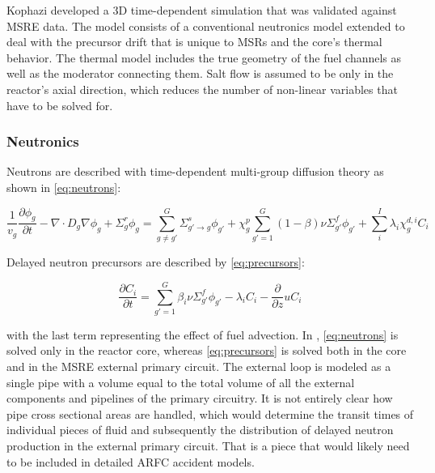 \documentclass{article}
\let\Oldsubsubsection\subsubsection
\renewcommand{\subsubsection}{\FloatBarrier\Oldsubsubsection}
\begin{document}
Kophazi developed a 3D time-dependent simulation that was validated against \gls{MSRE}
data. \cite{kophazi_development_????} The model consists of a conventional
neutronics model extended to deal with the precursor drift that is unique to
MSRs and the core's thermal behavior. The thermal model includes the true
geometry of the fuel channels as well as the moderator connecting them. Salt
flow is assumed to be only in the reactor's axial direction, which reduces the
number of non-linear variables that have to be solved for.

\subsubsection{Neutronics}

Neutrons are described with time-dependent multi-group diffusion theory as shown
in \cref{eq:neutrons}:

\begin{equation}
\frac{1}{v_g}\frac{\partial \phi_g}{\partial t} - \nabla \cdot D_g \nabla \phi_g
+ \Sigma_g^r \phi_g = \sum_{g \ne g'}^G \Sigma_{g'\rightarrow g}^s \phi_{g'} + \chi_g^p \sum_{g' = 1}^G (1 - \beta)
\nu \Sigma_{g'}^f \phi_{g'} + \sum_i^I \lambda_i \chi_g^{d,i} C_i
\label{eq:neutrons}
\end{equation}

Delayed neutron precursors are described by \cref{eq:precursors}:

\begin{equation}
\frac{\partial C_i}{\partial t} = \sum_{g'= 1}^G \beta_i \nu \Sigma_{g'}^f
\phi_{g'} - \lambda_i C_i - \frac{\partial}{\partial z} u C_i
\label{eq:precursors}
\end{equation}

with the last term representing the effect of fuel advection. In
\cite{kophazi_development_????}, \cref{eq:neutrons} is solved only in the
reactor core, whereas \cref{eq:precursors} is solved both in the core and in the
\gls{MSRE} external primary circuit. The external loop is modeled as a single pipe
with a volume equal to the total volume of all the external components and
pipelines of the primary circuitry. \cite{kophazi_development_????} It is not
entirely clear how pipe cross sectional areas are handled, which would determine
the transit times of individual pieces of fluid and subsequently the
distribution of delayed neutron production in the external primary circuit. That
is a piece that would likely need to be included in detailed ARFC accident
models.
\end{document}
